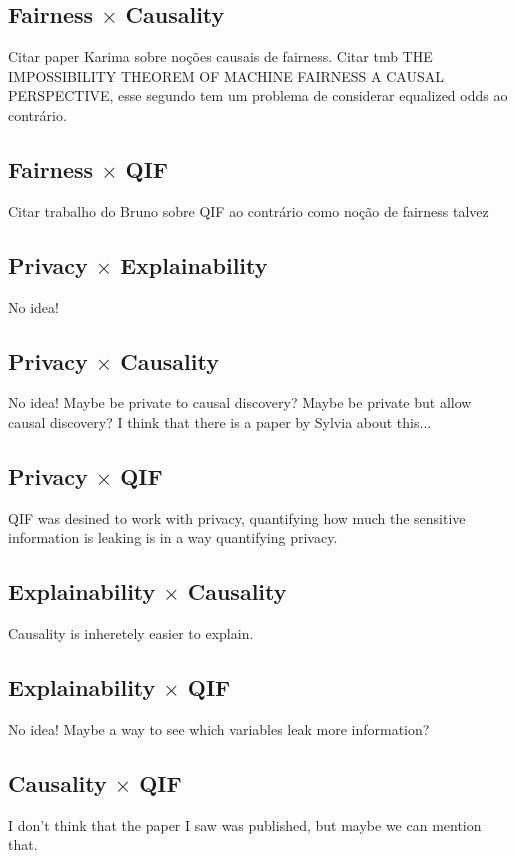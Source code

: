 \subsection{Fairness $\times$ Causality}

{\color{red} Citar paper Karima sobre noções causais de fairness. Citar tmb THE IMPOSSIBILITY THEOREM OF MACHINE FAIRNESS A CAUSAL PERSPECTIVE, esse segundo tem um problema de considerar equalized odds ao contrário.}

\subsection{Fairness $\times$ QIF}

{\color{red} Citar trabalho do Bruno sobre QIF ao contrário como noção de fairness talvez}

\subsection{Privacy $\times$ Explainability}

{\color{red} No idea!}

\subsection{Privacy $\times$ Causality}

{\color{red} No idea! Maybe be private to causal discovery? Maybe be private but allow causal discovery? I think that there is a paper by Sylvia about this...}

\subsection{Privacy $\times$ QIF}

{\color{red} QIF was desined to work with privacy, quantifying how much the sensitive information is leaking is in a way quantifying privacy.}

\subsection{Explainability $\times$ Causality}

{\color{red} Causality is inheretely easier to explain.}

\subsection{Explainability $\times$ QIF}

{\color{red} No idea! Maybe a way to see which variables leak more information?}

\subsection{Causality $\times$ QIF}

{\color{red} I don't think that the paper I saw was published, but maybe we can mention that.}

